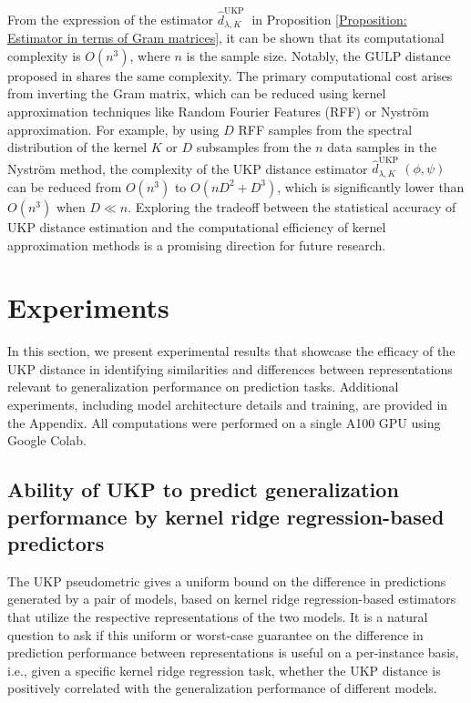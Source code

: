 \documentclass[11pt]{article}
\newcommand{\metricstname}{UKP }
\theoremstyle{plain}
\begin{document}
From the expression of the estimator $\hat{d}_{\lambda,K}^{\text{\metricstname}}$ in Proposition \ref{Proposition: Estimator in terms of Gram matrices}, it can be shown that its computational complexity is $O(n^3)$, where $n$ is the sample size. Notably, the GULP distance proposed in \citet{GULP} shares the same complexity. The primary computational cost arises from inverting the Gram matrix, which can be reduced using kernel approximation techniques like Random Fourier Features (RFF) or Nystr\"{o}m approximation. For example, by using $D$ RFF samples from the spectral distribution of the kernel $K$ or $D$ subsamples from the $n$ data samples in the Nystr\"{o}m method, the complexity of the UKP distance estimator $\hat{d}_{\lambda,K}^{\text{\metricstname}}(\phi,\psi)$ can be reduced from $O(n^3)$ to $O(nD^{2} + D^{3})$, which is significantly lower than $O(n^3)$ when $D \ll n$. Exploring the tradeoff between the statistical accuracy of \metricstname distance estimation and the computational efficiency of kernel approximation methods is a promising direction for future research.

\section{Experiments} \label{experiments}

 In this section, we present experimental results that showcase the efficacy of the \metricstname distance in identifying similarities and differences between representations relevant to generalization performance on prediction tasks. Additional experiments, including model architecture details and training, are provided in the Appendix. All computations were performed on a single A100 GPU using Google Colab.

\subsection{Ability of \metricstname to predict generalization performance by kernel ridge regression-based predictors} \label{MNIST experiments}
The \metricstname pseudometric gives a uniform bound on the difference in predictions generated by a pair of models, based on kernel ridge regression-based estimators that utilize the respective representations of the two models. It is a natural question to ask if this uniform or worst-case guarantee on the difference in prediction performance between representations is useful on a per-instance basis, i.e., given a specific kernel ridge regression task, whether the \metricstname distance is positively correlated with the generalization performance of different models.
\end{document}

